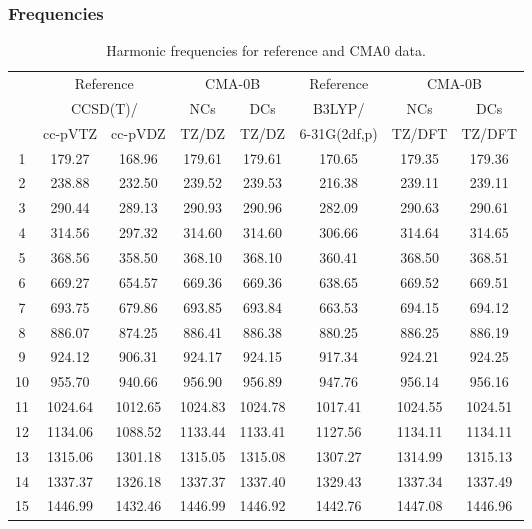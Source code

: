 \documentclass[10pt,oneside]{article}
\begin{document}
\subsubsection*{Frequencies}
\begin{table}[h!]
\centering
\caption{Harmonic frequencies for reference and CMA0 data.}
\begin{tabular}{cccccccc}
\toprule
{} & \multicolumn{2}{c}{Reference} & \multicolumn{2}{c}{CMA-0B} &    Reference & \multicolumn{2}{c}{CMA-0B} \\
{} & \multicolumn{2}{c}{CCSD(T)/} &     NCs &     DCs &       B3LYP/ &     NCs &     DCs \\
{} &   cc-pVTZ & cc-pVDZ &   TZ/DZ &   TZ/DZ & 6-31G(2df,p) &  TZ/DFT &  TZ/DFT \\
\midrule
1  &    179.27 &  168.96 &  179.61 &  179.61 &       170.65 &  179.35 &  179.36 \\
2  &    238.88 &  232.50 &  239.52 &  239.53 &       216.38 &  239.11 &  239.11 \\
3  &    290.44 &  289.13 &  290.93 &  290.96 &       282.09 &  290.63 &  290.61 \\
4  &    314.56 &  297.32 &  314.60 &  314.60 &       306.66 &  314.64 &  314.65 \\
5  &    368.56 &  358.50 &  368.10 &  368.10 &       360.41 &  368.50 &  368.51 \\
6  &    669.27 &  654.57 &  669.36 &  669.36 &       638.65 &  669.52 &  669.51 \\
7  &    693.75 &  679.86 &  693.85 &  693.84 &       663.53 &  694.15 &  694.12 \\
8  &    886.07 &  874.25 &  886.41 &  886.38 &       880.25 &  886.25 &  886.19 \\
9  &    924.12 &  906.31 &  924.17 &  924.15 &       917.34 &  924.21 &  924.25 \\
10 &    955.70 &  940.66 &  956.90 &  956.89 &       947.76 &  956.14 &  956.16 \\
11 &   1024.64 & 1012.65 & 1024.83 & 1024.78 &      1017.41 & 1024.55 & 1024.51 \\
12 &   1134.06 & 1088.52 & 1133.44 & 1133.41 &      1127.56 & 1134.11 & 1134.11 \\
13 &   1315.06 & 1301.18 & 1315.05 & 1315.08 &      1307.27 & 1314.99 & 1315.13 \\
14 &   1337.37 & 1326.18 & 1337.37 & 1337.40 &      1329.43 & 1337.34 & 1337.49 \\
15 &   1446.99 & 1432.46 & 1446.99 & 1446.92 &      1442.76 & 1447.08 & 1446.96 \\

\end{tabular}
\end{table}
\end{document}
